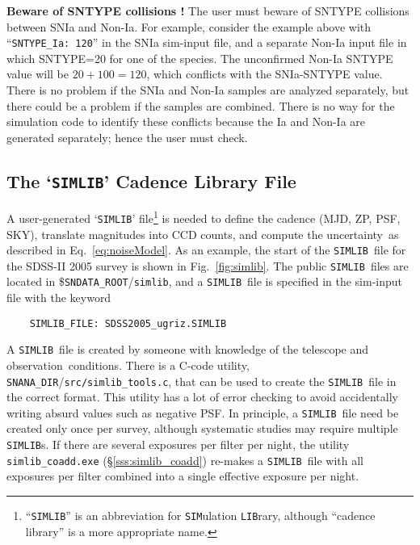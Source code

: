 \documentclass[12pt]{article}
\newcommand{\unc}{uncertainty}
\newcommand{\snanadir}{{\tt SNANA\_DIR}}
\newcommand{\sndataroot}{{\tt SNDATA\_ROOT}}
\newcommand{\simlib}{{\tt SIMLIB}}
\newcommand{\obs}{observation}
\begin{document}
{\bigskip
{\bf Beware of SNTYPE collisions !}
The user must beware of SNTYPE collisions between SNIa and Non-Ia.
For example, consider the example above with 
``{\tt SNTYPE\_Ia: 120}'' in the SNIa sim-input file,
and a separate Non-Ia input file in which SNTYPE=20
for one of the species. The unconfirmed Non-Ia SNTYPE
value will be $20+100 = 120$, which conflicts with the
SNIa-SNTYPE value. There is no problem if the SNIa and
Non-Ia samples are analyzed separately, but there could
be a problem if the samples are combined. There is no
way for the simulation code to identify these conflicts because
the Ia and Non-Ia are generated separately; hence the
user must check.


  \clearpage
  \subsection{The `{\simlib}' Cadence Library File }
  \label{subsec:simlib}

A user-generated `{\simlib}' 
file\footnote{``{\simlib}'' is an abbreviation for 
   {\tt SIM}ulation {\tt LIB}rary, although ``cadence library'' 
   is a more appropriate name.}
is needed to define the cadence (MJD, ZP, PSF, SKY), 
translate magnitudes into CCD counts, 
and compute the \unc\ as described in Eq.~\ref{eq:noiseModel}.
%
As an example, the start of the \simlib\ file for the 
SDSS-II 2005 survey is shown in  Fig.~\ref{fig:simlib}.
The public \simlib\ files are located in \$\sndataroot/{\tt simlib},
and a \simlib\ file is specified in the sim-input file with 
the keyword
%
\begin{verbatim}
    SIMLIB_FILE: SDSS2005_ugriz.SIMLIB
\end{verbatim}
%

A \simlib\ file is created by someone with knowledge of the
telescope and \obs\ conditions. There is a C-code utility, 
\snanadir/{\tt src/simlib\_tools.c}, 
that can be used to create the \simlib\ file in the correct format.
This utility has a lot of error checking to avoid
accidentally writing absurd values such as negative PSF.
In principle, a \simlib\ file need be created only once per survey,
although systematic studies may require multiple \simlib s.
If there are several exposures per filter per night,
the utility {\tt simlib\_coadd.exe} (\S\ref{sss:simlib_coadd})
re-makes a \simlib\ file with all exposures per filter combined
into a single effective exposure per night.

}
\end{document}
